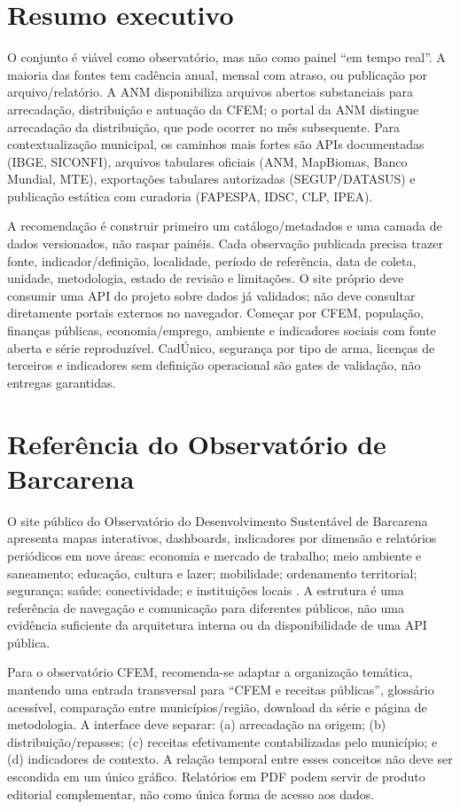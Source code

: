 \documentclass[12pt]{article}
\begin{document}
\section{Resumo executivo}
O conjunto é viável como observatório, mas não como painel ``em tempo real''. A maioria das fontes tem cadência anual, mensal com atraso, ou publicação por arquivo/relatório. A ANM disponibiliza arquivos abertos substanciais para arrecadação, distribuição e autuação da CFEM; o portal da ANM distingue arrecadação da distribuição, que pode ocorrer no mês subsequente. Para contextualização municipal, os caminhos mais fortes são APIs documentadas (IBGE, SICONFI), arquivos tabulares oficiais (ANM, MapBiomas, Banco Mundial, MTE), exportações tabulares autorizadas (SEGUP/DATASUS) e publicação estática com curadoria (FAPESPA, IDSC, CLP, IPEA).

A recomendação é construir primeiro um catálogo/metadados e uma camada de dados versionados, não raspar painéis. Cada observação publicada precisa trazer fonte, indicador/definição, localidade, período de referência, data de coleta, unidade, metodologia, estado de revisão e limitações. O site próprio deve consumir uma API do projeto sobre dados já validados; não deve consultar diretamente portais externos no navegador. Começar por CFEM, população, finanças públicas, economia/emprego, ambiente e indicadores sociais com fonte aberta e série reproduzível. CadÚnico, segurança por tipo de arma, licenças de terceiros e indicadores sem definição operacional são gates de validação, não entregas garantidas.

\section{Referência do Observatório de Barcarena}
O site público do Observatório do Desenvolvimento Sustentável de Barcarena apresenta mapas interativos, dashboards, indicadores por dimensão e relatórios periódicos em nove áreas: economia e mercado de trabalho; meio ambiente e saneamento; educação, cultura e lazer; mobilidade; ordenamento territorial; segurança; saúde; conectividade; e instituições locais \cite{odsb}. A estrutura é uma referência de navegação e comunicação para diferentes públicos, não uma evidência suficiente da arquitetura interna ou da disponibilidade de uma API pública.

Para o observatório CFEM, recomenda-se adaptar a organização temática, mantendo uma entrada transversal para ``CFEM e receitas públicas'', glossário acessível, comparação entre municípios/região, download da série e página de metodologia. A interface deve separar: (a) arrecadação na origem; (b) distribuição/repasses; (c) receitas efetivamente contabilizadas pelo município; e (d) indicadores de contexto. A relação temporal entre esses conceitos não deve ser escondida em um único gráfico. Relatórios em PDF podem servir de produto editorial complementar, não como única forma de acesso aos dados.
\end{document}
